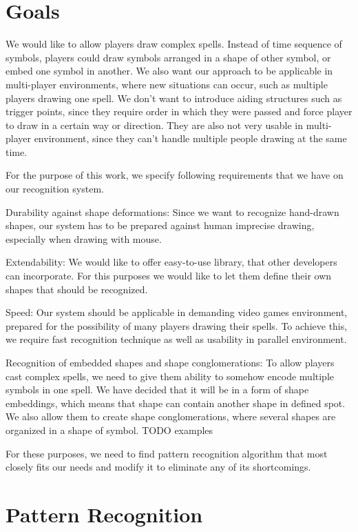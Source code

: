 \chapter{Goals}
\label{chap:gf}

We would like to allow players draw complex spells. Instead of time sequence of symbols, players could draw symbols arranged in a shape of other symbol, or embed one symbol in another. We also want our approach to be applicable in multi-player environments, where new situations can occur, such as multiple players drawing one spell. We don't want to introduce aiding structures such as trigger points, since they require order in which they were passed and force player to draw in a certain way or direction. They are also not very usable in multi-player environment, since they can't handle multiple people drawing at the same time.

For the purpose of this work, we specify following requirements that we have on our recognition system. 

Durability against shape deformations: Since we want to recognize hand-drawn shapes, our system has to be prepared against human imprecise drawing, especially when drawing with mouse.

Extendability: We would like to offer easy-to-use library, that other developers can incorporate. For this purposes we would like to let them define their own shapes that should be recognized.

Speed: Our system should be applicable in demanding video games environment, prepared for the possibility of many players drawing their spells. To achieve this, we require fast recognition technique as well as usability in parallel environment.

Recognition of embedded shapes and shape conglomerations: To allow players cast complex spells, we need to give them ability to somehow encode multiple symbols in one spell. We have decided that it will be in a form of shape embeddings, which means that shape can contain another shape in defined spot. We also allow them to create shape conglomerations, where several shapes are organized in a shape of symbol. TODO examples

For these purposes, we need to find pattern recognition algorithm that most closely fits our needs and modify it to eliminate any of its shortcomings.

\chapter{Pattern Recognition}
\label{chap:gf}

